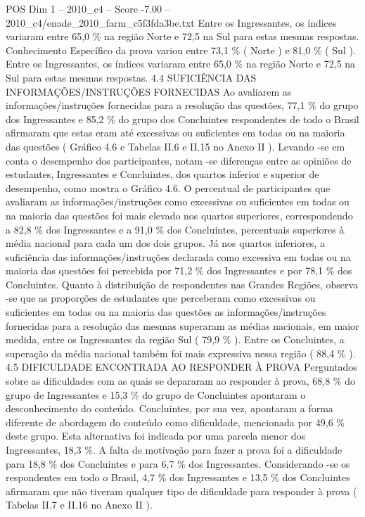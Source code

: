 \begin{textsample}{POS Dim 1 – 2010\_c4 – Score -7.00 – 2010\_c4/enade\_2010\_farm\_c5f3fda3be.txt}
Entre os Ingressantes, os índices variaram entre 65,0 \% na região Norte e 72,5 na Sul para estas mesmas respostas.
Conhecimento Específico da prova variou entre 73,1 \% ( Norte ) e 81,0 \% ( Sul ).
Entre os Ingressantes, os índices variaram entre 65,0 \% na região Norte e 72,5 na Sul para estas mesmas respostas. 4.4 SUFICIÊNCIA DAS INFORMAÇÕES/INSTRUÇÕES FORNECIDAS Ao avaliarem as informações/instruções fornecidas para a resolução das questões, 77,1 \% do grupo dos Ingressantes e 85,2 \% do grupo dos Concluintes respondentes de todo o Brasil afirmaram que estas eram até excessivas ou suficientes em todas ou na maioria das questões ( Gráfico 4.6 e Tabelas II.6 e II.15 no Anexo II ).
Levando -se em conta o desempenho dos participantes, notam -se diferenças entre as opiniões de estudantes, Ingressantes e Concluintes, dos quartos inferior e superior de desempenho, como mostra o Gráfico 4.6.
O percentual de participantes que avaliaram as informações/instruções como excessivas ou suficientes em todas ou na maioria das questões foi mais elevado nos quartos superiores, correspondendo a 82,8 \% dos Ingressantes e a 91,0 \% dos Concluintes, percentuais superiores à média nacional para cada um dos dois grupos.
Já nos quartos inferiores, a suficiência das informações/instruções declarada como excessiva em todas ou na maioria das questões foi percebida por 71,2 \% dos Ingressantes e por 78,1 \% dos Concluintes.
Quanto à distribuição de respondentes nas Grandes Regiões, observa -se que as proporções de estudantes que perceberam como excessivas ou suficientes em todas ou na maioria das questões as informações/instruções fornecidas para a resolução das mesmas superaram as médias nacionais, em maior medida, entre os Ingressantes da região Sul ( 79,9 \% ).
Entre os Concluintes, a superação da média nacional também foi mais expressiva nessa região ( 88,4 \% ). 4.5 DIFICULDADE ENCONTRADA AO RESPONDER À PROVA Perguntados sobre as dificuldades com as quais se depararam ao responder à prova, 68,8 \% do grupo de Ingressantes e 15,3 \% do grupo de Concluintes apontaram o desconhecimento do conteúdo.
Concluintes, por sua vez, apontaram a forma diferente de abordagem do conteúdo como dificuldade, mencionada por 49,6 \% deste grupo.
Esta alternativa foi indicada por uma parcela menor dos Ingressantes, 18,3 \%.
A falta de motivação para fazer a prova foi a dificuldade para 18,8 \% dos Concluintes e para 6,7 \% dos Ingressantes.
Considerando -se os respondentes em todo o Brasil, 4,7 \% dos Ingressantes e 13,5 \% dos Concluintes afirmaram que não tiveram qualquer tipo de dificuldade para responder à prova ( Tabelas II.7 e II.16 no Anexo II ).

\end{textsample}
